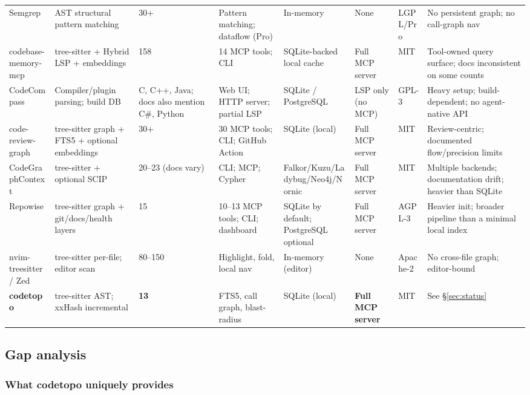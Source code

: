 \begin{longtable}{p{2.0cm}p{2.6cm}p{1.7cm}p{1.8cm}p{1.6cm}p{1.4cm}p{0.7cm}p{3.2cm}}
Semgrep & AST structural pattern matching & 30+ & Pattern matching; dataflow (Pro) & In-memory & None & LGPL/Pro & No persistent graph; no call-graph nav \\
codebase-memory-mcp & tree-sitter + Hybrid LSP + embeddings & 158 & 14 MCP tools; CLI & SQLite-backed local cache & Full MCP server & MIT & Tool-owned query surface; docs inconsistent on some counts \\
CodeCompass & Compiler/plugin parsing; build DB & C, C++, Java; docs also mention C\#, Python & Web UI; HTTP server; partial LSP & SQLite / PostgreSQL & LSP only (no MCP) & GPL-3 & Heavy setup; build-dependent; no agent-native API \\
code-review-graph & tree-sitter graph + FTS5 + optional embeddings & 30+ & 30 MCP tools; CLI; GitHub Action & SQLite (local) & Full MCP server & MIT & Review-centric; documented flow/precision limits \\
CodeGraphContext & tree-sitter + optional SCIP & 20--23 (docs vary) & CLI; MCP; Cypher & Falkor/Kuzu/Ladybug/Neo4j/Nornic & Full MCP server & MIT & Multiple backends; documentation drift; heavier than SQLite \\
Repowise & tree-sitter graph + git/docs/health layers & 15 & 10--13 MCP tools; CLI; dashboard & SQLite by default; PostgreSQL optional & Full MCP server & AGPL-3 & Heavier init; broader pipeline than a minimal local index \\
nvim-treesitter / Zed & tree-sitter per-file; editor scan & 80--150 & Highlight, fold, local nav & In-memory (editor) & None & Apache-2 & No cross-file graph; editor-bound \\
\textbf{codetopo} & tree-sitter AST; xxHash incremental & \textbf{13} & FTS5, call graph, blast-radius & SQLite (local) & \textbf{Full MCP server} & MIT & See \S\ref{sec:status} \\
\end{longtable}

\subsection{Gap analysis}

\subsubsection{What codetopo uniquely provides}

